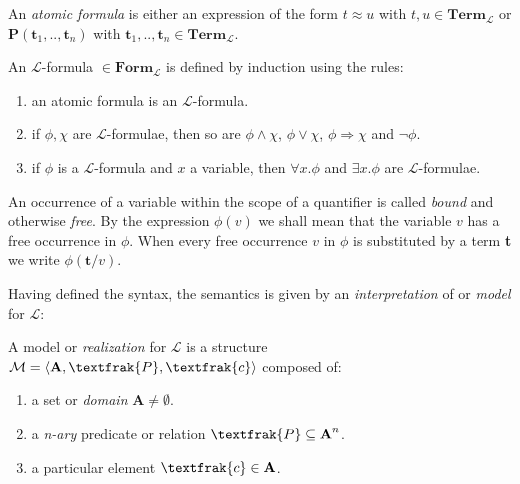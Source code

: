 \begin{definition}
	An \emph{atomic formula} is either an expression of the form $t \approx u$ with $t,u\in \textbf{Term}_\mathcal{L}$  or $\textbf{P}(\textbf{t}_1,..,\textbf{t}_n)$ with $\textbf{t}_1,..,\textbf{t}_n \in \textbf{Term}_\mathcal{L}$.
\end{definition}

\begin{definition}
	An $\mathcal{L}$-formula $\in \textbf{Form}_\mathcal{L} $ is defined by induction using the rules:
	\begin{enumerate}
			\item an atomic formula is an $\mathcal{L}$-formula.
			\item if $\phi, \chi$ are $\mathcal{L}$-formulae, then so are $\phi \land \chi$, $\phi \lor \chi$,
			$\phi \Rightarrow \chi$ and $\neg \phi$.
			\item if $\phi$ is a $\mathcal{L}$-formula and $x$ a variable, then $\forall x.\phi$ and $\exists x.\phi$ are  $\mathcal{L}$-formulae.
		\end{enumerate}
\end{definition}

An occurrence of a variable within the scope of a quantifier is called \emph{bound} and otherwise \emph{free}.\newline
By the expression $\phi(v)$ we shall mean that the variable $v$ has a free occurrence in $\phi$. \newline
When every free occurrence $v$ in $\phi$ is substituted by a term \textbf{t} we write $\phi(\textbf{t}/v)$. \newline


Having defined the syntax, the semantics is given by an \emph{interpretation} of or \emph{model} for $\mathcal{L}$:

\begin{definition}
	A model or \emph{realization} for $\mathcal{L}$ is a structure $\mathcal{M}= \langle \textbf{A}, \textfrak{P}, \textfrak{c} \rangle$ composed of:
	\begin{enumerate}[label=(\roman*)]
			\item a set or \emph{domain} $\textbf{A}\neq \emptyset$.
			\item a \emph{n-ary} predicate or relation $\textfrak{P} \subseteq \textbf{A}^n$.
			\item a particular element $\textfrak{c}\in \textbf{A}$.
		\end{enumerate}
\end{definition}

